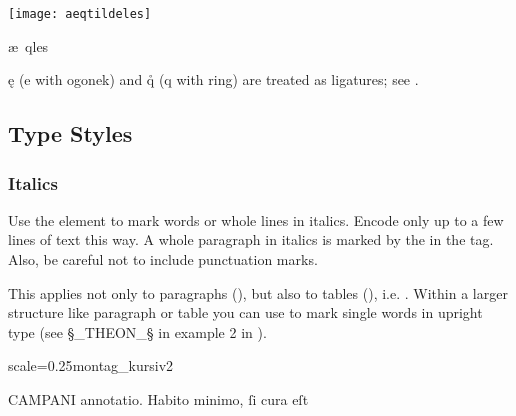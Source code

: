 \begin{example}

\texttt{[image: aeqtildeles]}

\vspace{-3mm}
\begin{typeLatin}
æ\bs~qles
\end{typeLatin}

\end{example}

\begin{note}
\k{e} (e with ogonek) and \r{q} (q with ring) are treated as ligatures; see .
\end{note}


\tocspace
\subsection{Type Styles}

\subsubsection{Italics}
\label{section italics}

\begin{mainrule}
Use the element  to mark words or whole lines in italics. Encode only up to a few lines of text this way. A whole paragraph in italics is marked by the  in the  tag. Also, be careful not to include punctuation marks.
\end{mainrule}

\begin{clarification}
  This applies not only to paragraphs (), but also to tables (), i.e. .
  Within a larger  structure like paragraph or table you can use  to mark single words in upright type (see §_THEON_§ in example 2 in ).
\end{clarification}

\begin{sampleImageSmall}{scale=0.25}{montag_kursiv2}
\begin{typeLatin}
CAMPANI annotatio. Habito minimo, ſi cura eſt
\end{typeLatin}
\end{sampleImageSmall}

